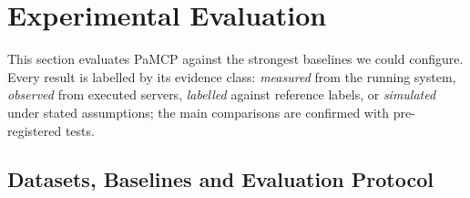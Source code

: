 \providecommand{\pamcp}{PaMCP}
\section{Experimental Evaluation}
\label{sec:ev}

This section evaluates \pamcp{} against the strongest baselines we could configure. Every result is labelled by
its evidence class: \emph{measured} from the running system, \emph{observed} from executed servers,
\emph{labelled} against reference labels, or \emph{simulated} under stated assumptions; the main comparisons are
confirmed with pre-registered tests.

\subsection{Datasets, Baselines and Evaluation Protocol}
\label{sec:ev-setup}

